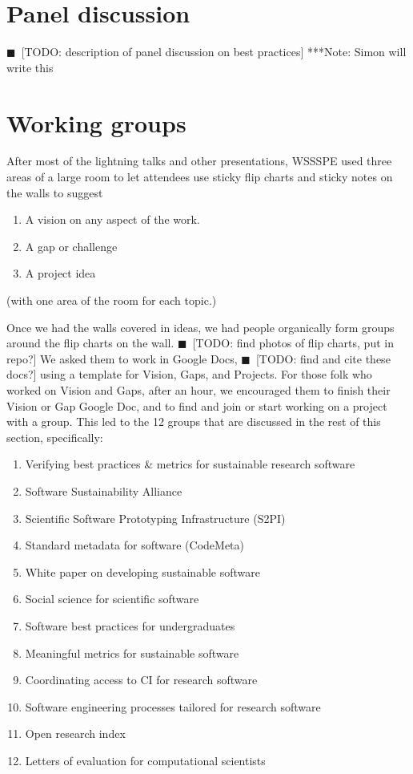 \documentclass[11pt, oneside]{amsart}
\newcommand{\todo}[1]{{\color{blue}$\blacksquare$~\textsf{[TODO: #1]}}}
\newcommand{\note}[1]{ {\textcolor{blueish}    { ***Note:      #1 }}}
\begin{document}
\section{Panel discussion} \label{sec:panel}

\todo{description of panel discussion on best practices} \note{Simon will write this}

\section{Working groups} \label{sec:WGs}

After most of the lightning talks and other presentations, WSSSPE used three areas of a large room to let
attendees use sticky flip charts and sticky notes on the walls to suggest
\begin{enumerate}
\item A vision on any aspect of the work.
\item A gap or challenge
\item A project idea
\end{enumerate}
(with one area of the room for each topic.)

Once we had the walls covered in ideas, we had people organically form groups around the flip charts on the wall. \todo{find photos of flip charts, put in repo?} We asked them to work in Google Docs, \todo{find and cite these docs?} using a template for Vision, Gaps, and Projects.  For those folk who worked on Vision and Gaps, after an hour, we encouraged them to finish their Vision or Gap Google Doc, and to find and join or start working on a project with a group. This led to the 12 groups that are discussed in the rest of this section, specifically:
\begin{enumerate}
\item Verifying best practices \& metrics for sustainable research software
\item Software Sustainability Alliance
\item Scientific Software Prototyping Infrastructure (S2PI)
\item Standard metadata for software (CodeMeta)
\item White paper on developing sustainable software
\item Social science for scientific software
\item Software best practices for undergraduates
\item Meaningful metrics for sustainable software
\item Coordinating access to CI for research software
\item Software engineering processes tailored for research software
\item Open research index
\item Letters of evaluation for computational scientists
\end{enumerate}
\end{document}
